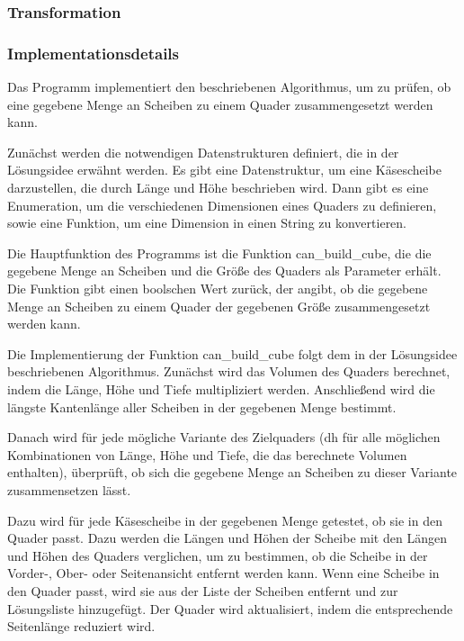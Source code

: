 \documentclass[a4paper,10pt,ngerman]{scrartcl}
\begin{document}
    \subsubsection{Transformation}\label{subsubsec:transformation}

    \subsubsection{Implementationsdetails}\label{subsubsec:implementationsdetails}

    Das Programm implementiert den beschriebenen Algorithmus, um zu prüfen, ob eine gegebene Menge an Scheiben zu einem Quader zusammengesetzt werden kann.

    Zunächst werden die notwendigen Datenstrukturen definiert, die in der Lösungsidee erwähnt werden.
    Es gibt eine Datenstruktur, um eine Käsescheibe darzustellen, die durch Länge und Höhe beschrieben wird.
    Dann gibt es eine Enumeration, um die verschiedenen Dimensionen eines Quaders zu definieren, sowie eine Funktion, um eine Dimension in einen String zu konvertieren.

    Die Hauptfunktion des Programms ist die Funktion can\_build\_cube, die die gegebene Menge an Scheiben und die Größe des Quaders als Parameter erhält.
    Die Funktion gibt einen boolschen Wert zurück, der angibt, ob die gegebene Menge an Scheiben zu einem Quader der gegebenen Größe zusammengesetzt werden kann.

    Die Implementierung der Funktion can\_build\_cube folgt dem in der Lösungsidee beschriebenen Algorithmus.
    Zunächst wird das Volumen des Quaders berechnet, indem die Länge, Höhe und Tiefe multipliziert werden.
    Anschließend wird die längste Kantenlänge aller Scheiben in der gegebenen Menge bestimmt.

    Danach wird für jede mögliche Variante des Zielquaders (dh für alle möglichen Kombinationen von Länge, Höhe und Tiefe, die das berechnete Volumen enthalten), überprüft, ob sich die gegebene Menge an Scheiben zu dieser Variante zusammensetzen lässt.

    Dazu wird für jede Käsescheibe in der gegebenen Menge getestet, ob sie in den Quader passt.
    Dazu werden die Längen und Höhen der Scheibe mit den Längen und Höhen des Quaders verglichen, um zu bestimmen, ob die Scheibe in der Vorder-, Ober- oder Seitenansicht entfernt werden kann.
    Wenn eine Scheibe in den Quader passt, wird sie aus der Liste der Scheiben entfernt und zur Lösungsliste hinzugefügt.
    Der Quader wird aktualisiert, indem die entsprechende Seitenlänge reduziert wird.
\end{document}
